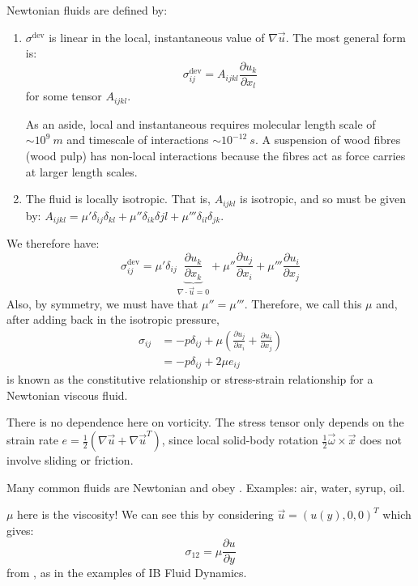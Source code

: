 \documentclass[../Main.tex]{subfiles}
\begin{document}
Newtonian fluids are defined by:
\begin{enumerate}
    \item $\sigma^\text{dev}$ is linear in the local, instantaneous value of $\nabla \vec{u}$.
        The most general form is:
        \begin{equation*}
            \sigma_{ij}^\text{dev} = A_{ijkl} \frac{\partial u_k}{\partial x_l}
        \end{equation*}
        for some tensor $A_{ijkl}$.

        As an aside, local and instantaneous requires molecular length scale of $\sim 10^9~m$ and timescale of interactions $\sim 10^{-12}~s$. A suspension of wood fibres (wood pulp) has non-local interactions because the fibres act as force carries at larger length scales.
    \item The fluid is locally isotropic. That is, $A_{ijkl}$ is isotropic, and so must be given by:
        $A_{ijkl} = \mu' \delta_{ij} \delta_{kl} + \mu'' \delta_{ik} \delta{jl} + \mu''' \delta_{il}\delta_{jk}$.
\end{enumerate}
We therefore have:
\begin{equation*}
    \sigma_{ij}^\text{dev} = \mu' \delta_{ij} \underbrace{\frac{\partial u_k}{\partial x_k}}_{\nabla \cdot \vec{u} = 0} + \mu'' \frac{\partial u_j}{\partial x_i} + \mu''' \frac{\partial u_i}{\partial x_j}
\end{equation*}
Also, by symmetry, we must have that $\mu'' = \mu'''$. Therefore, we call this $\mu$ and, after adding back in the isotropic pressure,
\begin{align}
    \sigma_{ij} &= -p \delta_{ij} + \mu \left(\frac{\partial u_j}{\partial x_i} + \frac{\partial u_i}{\partial x_j}\right) \nonumber \\
    &= -p \delta_{ij} + 2\mu e_{ij} \label{eqnConstitutive}
\end{align}
 is known as the constitutive relationship or stress-strain relationship for a Newtonian viscous fluid.

\begin{remarks}
    \item There is no dependence here on vorticity. The stress tensor only depends on the strain rate $e = \frac12 \left(\nabla \vec{u} + \nabla \vec{u}^T\right)$, since local solid-body rotation $\frac12 \vec{\omega} \times \vec{x}$ does not involve sliding or friction.
    \item Many common fluids are Newtonian and obey . Examples: air, water, syrup, oil.
    \item $\mu$ here is the viscosity! We can see this by considering $\vec{u} = (u(y), 0, 0)^T$ which gives:
        \begin{equation*}
            \sigma_{12} = \mu \frac{\partial u}{\partial y}
        \end{equation*}
        from , as in the examples of IB Fluid Dynamics.
\end{remarks}
\end{document}
